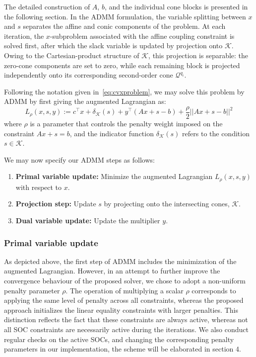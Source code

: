 The detailed construction of \(A\), \(b\), and the individual cone blocks is presented in the following section. In the ADMM formulation, the variable splitting between \(x\) and \(s\) separates the affine and conic components of the problem. At each iteration, the \(x\)-subproblem associated with the affine coupling constraint is solved first, after which the slack variable is updated by projection onto \(\mathcal{K}\). Owing to the Cartesian-product structure of \(\mathcal{K}\), this projection is separable: the zero-cone components are set to zero, while each remaining block is projected independently onto its corresponding second-order cone \(\mathcal{Q}^{q_i}\).



Following the notation given in~\eqref{eq:cvxproblem}, we may solve this problem by ADMM by first giving the augmented Lagrangian as:
\begin{equation}
L_\rho(x,s,y) := c^\top x+ \delta_{\mathcal{K}}(s)+y^\top (Ax+s-b)+\frac{\rho}{2}||Ax+s-b||^2
\end{equation} where $\rho$ is a parameter that controls the penalty weight imposed on the constraint $Ax+s = b$, and the indicator function $ \delta_{\mathcal{K}}(s)$ refers to the condition $s \in \mathcal{K}$.


We may now specify our ADMM steps as follows:

\begin{enumerate}
    \item \textbf{Primal variable update:} Minimize the augmented Lagrangian $L_\rho(x, s, y)$ with respect to $x$.
    
    \item \textbf{Projection step:} Update $s$ by projecting onto the intersecting cones, $\mathcal{K}$.
    
    \item \textbf{Dual variable update:} Update the multiplier $y$.
\end{enumerate}

\subsubsection{Primal variable update}

As depicted above, the first step of ADMM includes the minimization of the augmented Lagrangian. However, in an attempt to further improve the convergence behaviour of the proposed solver, we chose to adopt a non-uniform penalty parameter $\rho$. The operation of multiplying a scalar $\rho$ corresponds to applying the same level of penalty across all constraints, whereas the proposed approach initializes the linear equality constraints with larger penalties. This distinction reflects the fact that these constraints are always active, whereas not all SOC constraints are necessarily active during the iterations. We also conduct regular checks on the active SOCs, and changing the corresponding penalty parameters in our implementation, the scheme will be elaborated in section 4.

